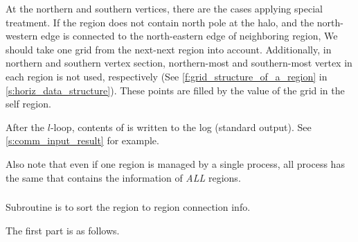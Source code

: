 At the northern and southern vertices, there are the cases applying special treatment.
If the region does not contain north pole at the halo,
and the north-western edge is connected to the north-eastern edge of neighboring region,
We should take one grid from the next-next region into account.
%
Additionally, in northern and southern vertex section, northern-most and southern-most vertex in each region
is not used, respectively (See \autoref{f:grid_structure_of_a_region} in \autoref{s:horiz_data_structure}).
These points are filled by the value of the grid in the self region.

After the $l$-loop, contents of  is written to the log
(standard output).
%
See \autoref{s:comm_input_result} for example.

Also note that even if one region is managed by a single process, all
process has the same  that contains the information of
\emph{ALL} regions.


\subsubsection{}

Subroutine  is to sort the region to region
connection info.

The first part is as follows.

